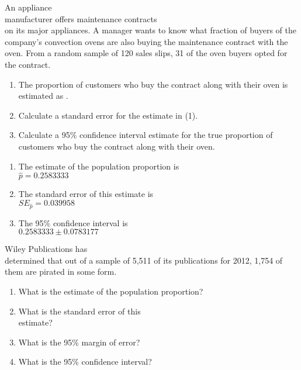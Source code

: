 \documentclass[11pt]{book}\usepackage[]{graphicx}\usepackage[]{color}
\begin{document}
\begin{exercises}
  \begin{exercise} %



An appliance \\ manufacturer offers maintenance contracts \\ on its major appliances.  A manager wants to know what fraction of buyers of the company's convection ovens are also buying the maintenance contract with the oven.  From a random sample of 120 sales slips, 31 of the oven buyers opted for the contract.

\begin{enumerate}
\item	The proportion of customers who buy the contract along with their oven is estimated as \underline{\phantom{xxxxxxxxxx}}.
\item	Calculate a standard error for the estimate in (1).
\item	Calculate a 95\% confidence interval estimate for the true proportion of customers who buy the contract along with their oven.
\end{enumerate}
  \end{exercise}
  \begin{solution} %

\begin{enumerate}
\item	The estimate of the population proportion is \\ $\hat{p} = 0.2583333$
\item	The standard error of this estimate is \\ $SE_{\hat{p}} = 0.039958$
\item	The 95\% confidence interval is \\ $0.2583333 \pm 0.0783177$
\end{enumerate}
  \end{solution}

  \begin{exercise} %



Wiley Publications has \\ determined that out of a sample of 5,511 of its publications for 2012, 1,754 of them are pirated in some form.

\begin{enumerate}
\item	What is the estimate of the population proportion?
\item	What is the standard error of this \\ estimate?
\item	What is the 95\% margin of error?
\item	What is the 95\% confidence interval?
\end{enumerate}
  \end{exercise}


\end{exercises}
\end{document}
